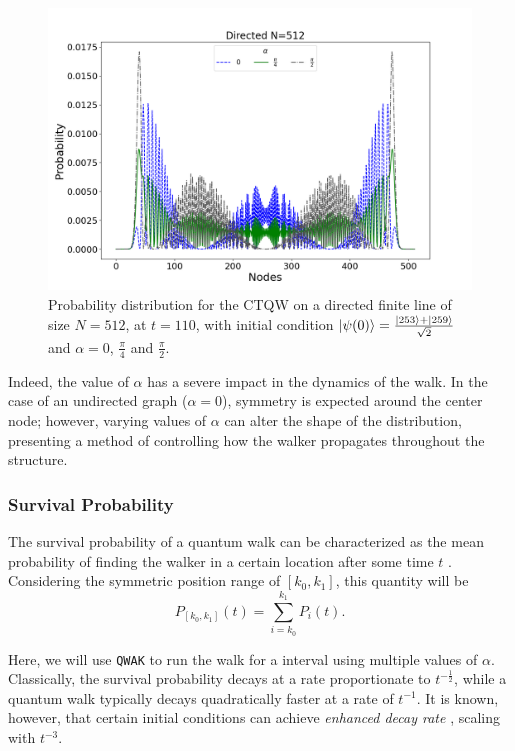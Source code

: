 \documentclass[main.tex]{subfiles}
\begin{document}
\begin{figure}[!h]
    \centering
    \includegraphics[scale=\mysinglefigurescale]{orDynN512NW3Alpha0.79-1.57TMAX110.png}
    \caption{Probability distribution for the CTQW on a 
        directed finite line of size $N=512$, at $t=110$, with initial condition  $\ket{\psi(0)}=\frac{\ket{253}+\ket{259}}{\sqrt{2}}$
    and $\alpha = 0$, $\frac{\pi}{4}$ and $\frac{\pi}{2}$.}
    \label{fig:multipleAlphaOrientedDynamics}
\end{figure}

Indeed, the value of $\alpha$ has a severe impact in the dynamics of the walk.
In the case of an undirected graph ($\alpha = 0$), symmetry is expected around
the center node; however, varying values of $\alpha$ can alter the shape of the
distribution, presenting a method of controlling how the walker propagates
throughout the structure.

\subsubsection{Survival Probability}
The survival probability of a quantum walk can be characterized as the mean
probability of finding the walker in a certain location after some time $t$
\cite{Goenuelol2011}. Considering the symmetric position range of $[k_0,k_1]$, this
quantity will be
\begin{equation}
    P_{[k_0,k_1]}(t)=\sum_{i=k_0}^{k_1} P_{i}(t).
\end{equation}

Here, we will use \texttt{QWAK} to run the walk for a interval using multiple
values of $\alpha$. Classically, the survival probability decays at a rate
proportionate to $t^{-\frac{1}{2}}$, while a quantum walk typically decays
quadratically faster at a rate of $t^{-1}$. It is known, however, that certain
initial conditions can achieve \textit{enhanced decay rate}
\cite{abalEffects06}, scaling with $t^{-3}$.\par
\end{document}
